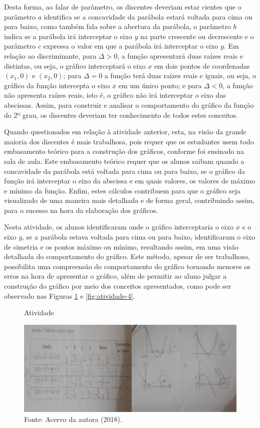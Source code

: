 \begin{refsection}
    Desta forma, ao falar de parâmetro, os discentes deveriam estar cientes que o parâmetro $a$ identifica se a concavidade da parábola estará voltada para cima ou para baixo, como também fala sobre a abertura da parábola, o parâmetro $b$ indica se a parábola irá interceptar o eixo $y$ na parte crescente ou decrescente e o parâmetro $c$ expressa o valor em que a parábola irá interceptar o eixo $y$. Em relação ao discriminante, para $\Delta > 0$, a função apresentará duas raízes reais e distintas, ou seja, o gráfico interceptará o eixo $x$ em dois pontos de coordenadas $(x_1, 0)$ e $(x_2, 0)$; para $\Delta = 0$ a função terá duas raízes reais e iguais, ou seja, o gráfico da função intercepta o eixo $x$ em um único ponto; e para $\Delta < 0$, a função não apresenta raízes reais, isto é, o gráfico não irá interceptar o eixo das abscissas. Assim, para construir e analisar o comportamento do gráfico da função do 2º grau, os discentes deveriam ter conhecimento de todos estes conceitos.  

    Quando questionados em relação à atividade anterior, esta, na visão da grande maioria dos discentes é mais trabalhosa, pois requer que os estudantes usem todo embasamento teórico para a construção dos gráficos, conforme foi ensinado na sala de aula. Este embasamento teórico requer que os alunos saibam quando a concavidade da parábola está voltada para cima ou para baixo, se o gráfico da função irá interceptar o eixo da abscissa e em quais valores, os valores de máximo e mínimo da função. Enfim, estes cálculos contribuem para que o gráfico seja visualizado de uma maneira mais detalhada e de forma geral, contribuindo assim, para o sucesso na hora da elaboração dos gráficos. 
    
    Nesta atividade, os alunos identificaram onde o gráfico interceptaria o eixo $x$ e o eixo $y$, se a parábola estava voltada para cima ou para baixo, identificaram o eixo de simetria e os pontos máximo ou mínimo, resultando assim, em uma visão detalhada do comportamento do gráfico. Este método, apesar de ser trabalhoso, possibilita uma compreensão do comportamento do gráfico tornando menores os erros na hora de apresentar o gráfico, além de permitir ao aluno julgar a construção do gráfico por meio dos conceitos apresentados, como pode ser observado nas Figuras \ref{fig:atividade-3} e \ref{fig:atividade-4}.

    \begin{figure}[ht]%
        \centering%
        \caption{Atividade}%
        \includegraphics[width=.80\textwidth]{articles/03-contribuicoes-do-sof/image10.jpeg}%
        \caption*{Fonte: Acervo da autora (2018).}%
        \label{fig:atividade-3}%
    \end{figure}%


\end{refsection}
